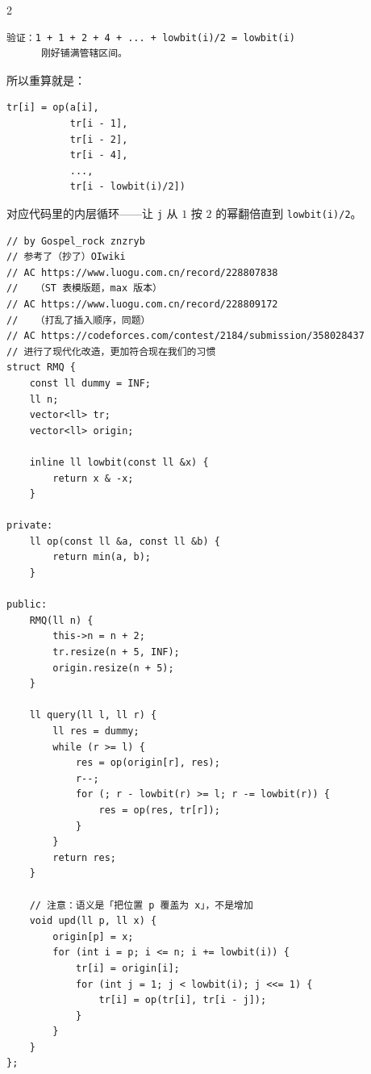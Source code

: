 \begin{multicols*}{2}
\begin{verbatim}
验证：1 + 1 + 2 + 4 + ... + lowbit(i)/2 = lowbit(i)
      刚好铺满管辖区间。
		\end{verbatim}

		所以重算就是：

		\begin{verbatim}
tr[i] = op(a[i],
           tr[i - 1],
           tr[i - 2],
           tr[i - 4],
           ...,
           tr[i - lowbit(i)/2])
		\end{verbatim}

		对应代码里的内层循环——让 \verb|j| 从 $1$ 按 $2$ 的幂翻倍直到 \verb|lowbit(i)/2|。



		\begin{verbatim}
// by Gospel_rock znzryb
// 参考了（抄了）OIwiki
// AC https://www.luogu.com.cn/record/228807838
//   （ST 表模版题，max 版本）
// AC https://www.luogu.com.cn/record/228809172
//   （打乱了插入顺序，同题）
// AC https://codeforces.com/contest/2184/submission/358028437
// 进行了现代化改造，更加符合现在我们的习惯
struct RMQ {
	const ll dummy = INF;
	ll n;
	vector<ll> tr;
	vector<ll> origin;

	inline ll lowbit(const ll &x) {
		return x & -x;
	}

private:
	ll op(const ll &a, const ll &b) {
		return min(a, b);
	}

public:
	RMQ(ll n) {
		this->n = n + 2;
		tr.resize(n + 5, INF);
		origin.resize(n + 5);
	}

	ll query(ll l, ll r) {
		ll res = dummy;
		while (r >= l) {
			res = op(origin[r], res);
			r--;
			for (; r - lowbit(r) >= l; r -= lowbit(r)) {
				res = op(res, tr[r]);
			}
		}
		return res;
	}

	// 注意：语义是「把位置 p 覆盖为 x」，不是增加
	void upd(ll p, ll x) {
		origin[p] = x;
		for (int i = p; i <= n; i += lowbit(i)) {
			tr[i] = origin[i];
			for (int j = 1; j < lowbit(i); j <<= 1) {
				tr[i] = op(tr[i], tr[i - j]);
			}
		}
	}
};
		\end{verbatim}


\end{multicols*}
